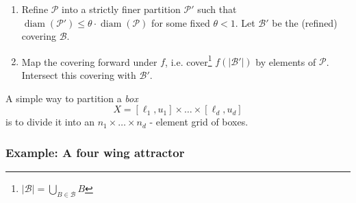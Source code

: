 \documentclass{juliacon}
\newcommand{\cB}{\mathcal{B}}
\newcommand{\cP}{\mathcal{P}}
\newcommand{\diam}{\mathop{\mathrm{diam}}}
\begin{document}
\begin{enumerate}
    \item Refine $\cP$ into a strictly finer partition $\cP'$ such that $\diam (\cP') \leq \theta \cdot \diam (\cP)$ for some fixed $\theta < 1$. Let $\cB'$ be the (refined) covering $\cB$. 
    \item Map the covering forward under $f$, i.e. cover\footnote{$\vert \cB \vert = \bigcup_{B \in \cB} B$} $f(\vert\cB'\vert)$  by elements of $\cP$. Intersect this covering with $\cB'$. 
\end{enumerate}

A simple way to partition a \emph{box} $$X = \left[ \ell_1, u_1 \right] \times \ldots \times \left[ \ell_d, u_d \right]$$  is to divide it into an $n_1 \times \ldots \times n_d$ - element grid of boxes. 

\subsubsection*{Example: A four wing attractor}
\end{document}
